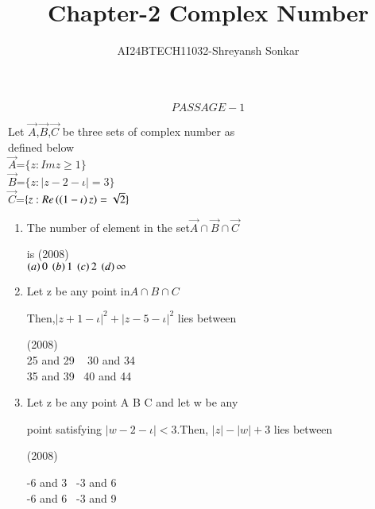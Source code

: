 \documentclass[journal,12pt,twocolumn]{IEEEtran}
\theoremstyle{remark}
\begin{document}

\vspace{3cm}

\title{Chapter-2 Complex Number}
\author{AI24BTECH11032-Shreyansh Sonkar
}
\maketitle
\newpage
\bigskip

\renewcommand{\thefigure}{\theenumi}
\renewcommand{\thetable}{\theenumi}
$$PASSAGE-1$$

    


 Let $\vec{A}$,$\vec{B}$,$\vec{C}$ be three sets of complex number as\\ 
  defined below\\
$\vec{A}$=$\{z:Im z\geq 1\}$\\
$\vec{B}$=$\{z:|z-2-\iota|=3\}$\\
$\vec{C}$=$\{z:Re\left(\left(1-\iota\right)z\right)=\sqrt{2}\}$\\
\begin{enumerate}
    

\item The number of element in the set$\vec{A} \cap\vec{B} \cap\vec{C} $

is \hfill (2008)\\

$\brak{a} 0 \ \brak{b} 1 \  \brak{c} 2 \ \brak{d}\infty \ $ \\

\item Let z be any point in$ A\cap B \cap C$

 Then,$|z+1-\iota|^2+|z-5-\iota|^2$ lies between
 
 \hfill  (2008) \\
             
 
   25 and 29 \   30 and 34\\
 
  35 and 39 \  40 and 44 \\

\item  Let z be any point A B C and let w be any

point satisfying $|w-2-\iota|<3$.Then, $|z|-|w|+3$ lies between
   
   \hfill (2008)

  -6 and 3\    -3 and 6 \\

  -6 and 6\    -3 and 9\\
 \end{enumerate}

 
\end{document}
